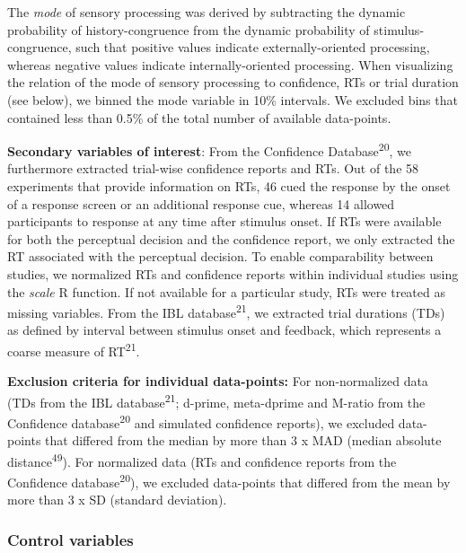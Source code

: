 \documentclass[
]{article}
\begin{document}
The \emph{mode} of sensory processing was derived by subtracting the
dynamic probability of history-congruence from the dynamic probability
of stimulus-congruence, such that positive values indicate
externally-oriented processing, whereas negative values indicate
internally-oriented processing. When visualizing the relation of the
mode of sensory processing to confidence, RTs or trial duration (see
below), we binned the mode variable in 10\% intervals. We excluded bins
that contained less than 0.5\% of the total number of available
data-points.

\textbf{Secondary variables of interest}: From the Confidence
Database\textsuperscript{20}, we furthermore extracted trial-wise
confidence reports and RTs. Out of the 58 experiments that provide
information on RTs, 46 cued the response by the onset of a response
screen or an additional response cue, whereas 14 allowed participants to
response at any time after stimulus onset. If RTs were available for
both the perceptual decision and the confidence report, we only
extracted the RT associated with the perceptual decision. To enable
comparability between studies, we normalized RTs and confidence reports
within individual studies using the \emph{scale} R function. If not
available for a particular study, RTs were treated as missing variables.
From the IBL database\textsuperscript{21}, we extracted trial durations
(TDs) as defined by interval between stimulus onset and feedback, which
represents a coarse measure of RT\textsuperscript{21}.

\textbf{Exclusion criteria for individual data-points:} For
non-normalized data (TDs from the IBL database\textsuperscript{21};
d-prime, meta-dprime and M-ratio from the Confidence
database\textsuperscript{20} and simulated confidence reports), we
excluded data-points that differed from the median by more than 3 x MAD
(median absolute distance\textsuperscript{49}). For normalized data (RTs
and confidence reports from the Confidence
database\textsuperscript{20}), we excluded data-points that differed
from the mean by more than 3 x SD (standard deviation).

\hypertarget{control-variables}{%
\subsubsection{Control variables}\label{control-variables}}
\end{document}
